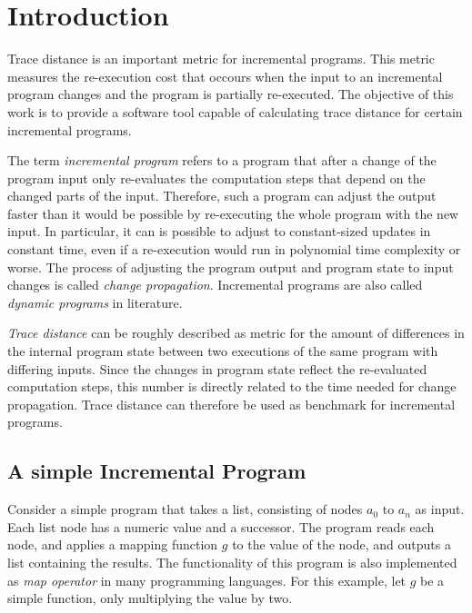 
\chapter{Introduction}
\label{ch:Introduction}

Trace distance is an important metric for incremental programs. This metric measures the re-execution cost that occours when the input to an incremental program changes and the program is partially re-executed. The objective of this work is to provide a software tool capable of calculating trace distance for certain incremental programs.  

The term \textit{incremental program} refers to a program that after a change of the program input only re-evaluates the computation steps that depend on the changed parts of the input. Therefore, such a program can adjust the output faster than it would be possible by re-executing the whole program with the new input. In particular, it can is possible to adjust to constant-sized updates in constant time, even if a re-execution would run in polynomial time complexity or worse. The process of adjusting the program output and program state to input changes is called \textit{change propagation}. Incremental programs are also called \textit{dynamic programs} in literature. 

\textit{Trace distance} can be roughly described as metric for the amount of differences in the internal program state between two executions of the same program with differing inputs. Since the changes in program state reflect the re-evaluated computation steps, this number is directly related to the time needed for change propagation. Trace distance can therefore be used as benchmark for incremental programs. 

\section{A simple Incremental Program}
\label{sec:simple_example}
Consider a simple program that takes a list, consisting of nodes $a_0$ to $a_n$ as input. Each list node has a numeric value and a successor. The program reads each node, and applies a mapping function $g$ to the value of the node, and outputs a list containing the results. The functionality of this program is also implemented as \textit{map operator} in many programming languages. For this example, let $g$ be a simple function, only multiplying the value by two. 

